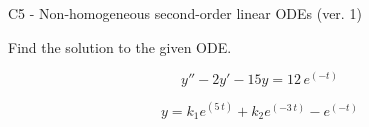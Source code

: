 \begin{exercise}
  \begin{exerciseTitle}C5 - Non-homogeneous second-order linear ODEs (ver. 1)\end{exerciseTitle}
  \begin{exerciseStatement}
    
Find the solution to the given ODE.

    
\[y''-2y'-15y = 12 \, e^{\left(-t\right)}\]

  \end{exerciseStatement}
  \begin{exerciseAnswer}
    
\[y= k_{1} e^{\left(5 \, t\right)} + k_{2} e^{\left(-3 \, t\right)} - e^{\left(-t\right)}\]

  \end{exerciseAnswer}
\end{exercise}